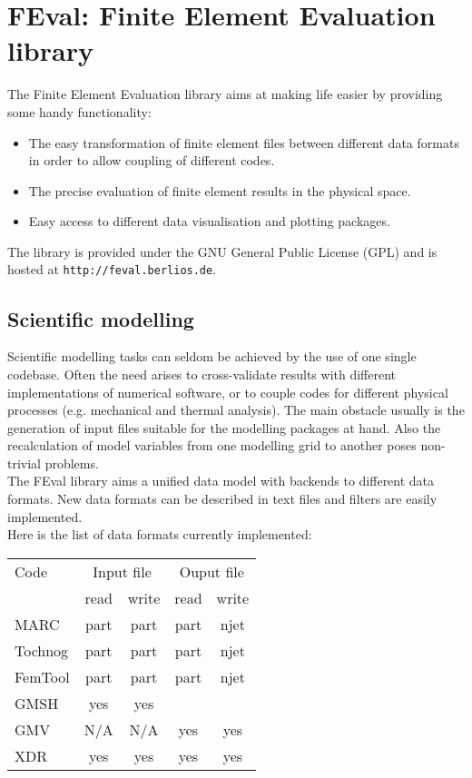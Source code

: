 
\section{FEval: Finite Element Evaluation library}
\label{sec:feval:-finite-elem}

The Finite Element Evaluation library aims at making life easier by providing
some handy functionality:

\begin{itemize}
\item The easy transformation of finite element files between different data
  formats in order to allow coupling of different codes.
\item The precise evaluation of finite element results in the physical space.
\item Easy access to different data visualisation and plotting packages.
\end{itemize}

The library is provided under the GNU General Public License (GPL) and is
hosted at \texttt{http://feval.berlios.de}.

\subsection{Scientific modelling}
\label{sec:scientific-modelling}

Scientific modelling tasks can seldom be achieved by the use of one single
codebase.  Often the need arises to cross-validate results with different
implementations of numerical software, or to couple codes for different
physical processes (e.g. mechanical and thermal analysis).  The main obstacle
usually is the generation of input files suitable for the modelling packages
at hand.  Also the recalculation of model variables from one modelling grid to
another poses non-trivial problems.\\

The FEval library aims a unified data model with backends to different data
formats.  New data formats can be described in text files and filters are
easily implemented.\\

Here is the list of  data formats currently implemented:\\

\begin{tabular}{lcccc}
\hline
Code    & \multicolumn{2}{c}{Input file} & \multicolumn{2}{c}{Ouput file} \\
        & read & write                   &  read & write \\
\hline
MARC    & part & part                    &  part & njet  \\
Tochnog & part & part                    &  part & njet  \\
FemTool & part & part                    &  part & njet  \\
GMSH    & yes  & yes                     &       &       \\
GMV     & N/A  & N/A                     &  yes  & yes   \\
XDR     & yes  & yes                     &  yes  & yes   \\
\hline
\end{tabular}


